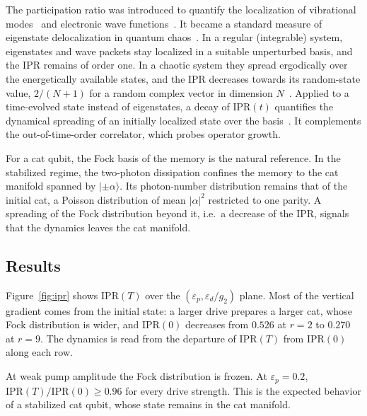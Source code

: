 \documentclass[aps,prx,reprint,floatfix,amsmath,amssymb,longbibliography]{revtex4-2}
\begin{document}
The participation ratio was introduced to quantify the localization of
vibrational modes~\cite{Bell1970} and electronic wave
functions~\cite{Wegner1980,Kramer1993}. It became a standard measure of
eigenstate delocalization in quantum chaos~\cite{Izrailev1990,Haake2010}. In a
regular (integrable) system, eigenstates and wave packets stay localized in a
suitable unperturbed basis, and the IPR remains of order one. In a chaotic
system they spread ergodically over the energetically available states, and
the IPR decreases towards its random-state value, $2/(N+1)$ for a random
complex vector in dimension $N$~\cite{Izrailev1990,Santos2010,Borgonovi2016}.
Applied to a time-evolved state instead of eigenstates, a decay of
$\mathrm{IPR}(t)$ quantifies the dynamical spreading of an initially localized
state over the basis~\cite{Borgonovi2016}. It complements the
out-of-time-order correlator, which probes operator growth.

For a cat qubit, the Fock basis of the memory is the natural reference. In the
stabilized regime, the two-photon dissipation confines the memory to the cat
manifold spanned by $|\pm\alpha\rangle$. Its photon-number distribution
remains that of the initial cat, a Poisson distribution of mean $|\alpha|^2$
restricted to one parity. A spreading of the Fock distribution beyond it,
i.e.\ a decrease of the IPR, signals that the dynamics leaves the cat
manifold.

\subsection{Results}

Figure~\ref{fig:ipr} shows $\mathrm{IPR}(T)$ over the
$(\varepsilon_p, \varepsilon_d/g_2)$ plane. Most of the vertical gradient
comes from the initial state: a larger drive prepares a larger cat, whose
Fock distribution is wider, and $\mathrm{IPR}(0)$ decreases from $0.526$ at
$r = 2$ to $0.270$ at $r = 9$. The dynamics is read from the departure of
$\mathrm{IPR}(T)$ from $\mathrm{IPR}(0)$ along each row.

At weak pump amplitude the Fock distribution is frozen. At
$\varepsilon_p = 0.2$, $\mathrm{IPR}(T)/\mathrm{IPR}(0) \geq 0.96$ for every
drive strength. This is the expected behavior of a stabilized cat qubit,
whose state remains in the cat manifold.
\end{document}

